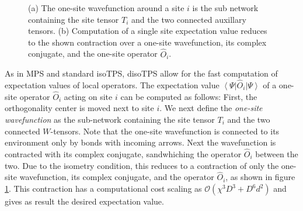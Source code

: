 \begin{figure}
{{		}
	}
	\caption{(a) The one-site wavefunction around a site $i$ is the sub network containing the site tensor $T_i$ and the two connected auxillary tensors. (b) Computation of a single site expectation value reduces to the shown contraction over a one-site wavefunction, its complex conjugate, and the one-site operator $\hat{O}_i$.}
	\label{fig:disoTPS_onesite_expectation_value}
\end{figure}
As in MPS and standard isoTPS, disoTPS allow for the fast computation of expectation values of local operators. The expectation value $\left\langle\Psi\right|\hat{O}_i\left|\Psi\right\rangle$ of a one-site operator $\hat{O}_i$ acting on site $i$ can be computed as follows: First, the orthogonality center is moved next to site $i$. We next define the \textit{one-site wavefunction} as the sub-network containing the site tensor $T_i$ and the two connected $W$-tensors. Note that the one-site wavefunction is connected to its environment only by bonds with incoming arrows. Next the wavefunction is contracted with its complex conjugate, sandwhiching the operator $\hat{O}_i$ between the two. Due to the isometry condition, this reduces to a contraction of only the one-site wavefunction, its complex conjugate, and the operator $\hat{O}_i$, as shown in figure \ref{fig:disoTPS_onesite_expectation_value}. This contraction has a computational cost scaling as $\mathcal{O}\left(\chi^3 D^3 + D^6d^2\right)$ and gives as result the desired expectation value. \par
